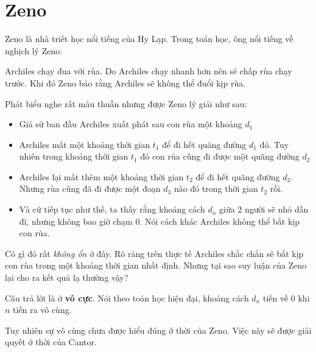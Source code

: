 \chapter{Zeno}

Zeno là nhà triết học nổi tiếng của Hy Lạp. Trong toán học, ông nổi tiếng về nghịch lý Zeno:

Archiles chạy đua với rùa. Do Archiles chạy nhanh hơn nên sẽ chấp rùa chạy trước. Khi đó Zeno bảo rằng Archiles sẽ không thể đuổi kịp rùa.

Phát biểu nghe rất mâu thuẫn nhưng được Zeno lý giải như sau:

\begin{itemize}
    \item Giả sử ban đầu Archiles xuất phát sau con rùa một khoảng $d_1$
    \item Archiles mất một khoảng thời gian $t_1$ để đi hết quãng đường $d_1$ đó. Tuy nhiên trong khoảng thời gian $t_1$ đó con rùa cũng đi được một quãng đường $d_2$
    \item Archiles lại mất thêm một khoảng thời gian $t_2$ để đi hết quãng đường $d_2$. Nhưng rùa cũng đã đi được một đoạn $d_3$ nào đó trong thời gian $t_2$ rồi.
    \item Và cứ tiếp tục như thế, ta thấy rằng khoảng cách $d_n$ giữa 2 người sẽ nhỏ dần đi, nhưng không bao giờ chạm 0. Nói cách khác Archiles không thể bắt kịp con rùa.
\end{itemize}

Có gì đó rất \textit{không ổn} ở đây. Rõ ràng trên thực tế Archiles chắc chắn sẽ bắt kịp con rùa trong một khoảng thời gian nhất định. Nhưng tại sao suy luận của Zeno lại cho ra kết quả lạ thường vậy?

Câu trả lời là ở \textbf{vô cực}. Nói theo toán học hiện đại, khoảng cách $d_n$ tiến về 0 khi $n$ tiến ra vô cùng.

Tuy nhiên sự vô cùng chưa được hiểu đúng ở thời của Zeno. Việc này sẽ được giải quyết ở thời của Cantor.